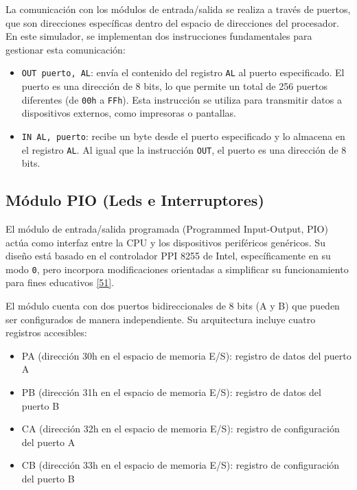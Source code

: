 \documentclass[12pt,oneside]{templates/unerthesis}
\providecommand{\tightlist}{%
  \setlength{\itemsep}{0pt}\setlength{\parskip}{0pt}}
\begin{document}
La comunicación con los módulos de entrada/salida se realiza a través de puertos, que son direcciones específicas dentro del espacio de direcciones del procesador. En este simulador, se implementan dos instrucciones fundamentales para gestionar esta comunicación:

\begin{itemize}
\tightlist
\item
  \texttt{OUT\ puerto,\ AL}: envía el contenido del registro \texttt{AL} al puerto especificado. El puerto es una dirección de 8 bits, lo que permite un total de 256 puertos diferentes (de \texttt{00h} a \texttt{FFh}). Esta instrucción se utiliza para transmitir datos a dispositivos externos, como impresoras o pantallas.
\item
  \texttt{IN\ AL,\ puerto}: recibe un byte desde el puerto especificado y lo almacena en el registro \texttt{AL}. Al igual que la instrucción \texttt{OUT}, el puerto es una dirección de 8 bits.
\end{itemize}

\hypertarget{muxf3dulo-pio-leds-e-interruptores}{%
\subsection{Módulo PIO (Leds e Interruptores)}\label{muxf3dulo-pio-leds-e-interruptores}}

El módulo de entrada/salida programada (Programmed Input-Output, PIO) actúa como interfaz entre la CPU y los dispositivos periféricos genéricos. Su diseño está basado en el controlador PPI 8255 de Intel, específicamente en su modo \texttt{0}, pero incorpora modificaciones orientadas a simplificar su funcionamiento para fines educativos \protect\hyperlink{ref-intel8086manual}{{[}51{]}}.

El módulo cuenta con dos puertos bidireccionales de 8 bits (A y B) que pueden ser configurados de manera independiente. Su arquitectura incluye cuatro registros accesibles:

\begin{itemize}
\tightlist
\item
  PA (dirección 30h en el espacio de memoria E/S): registro de datos del puerto A
\item
  PB (dirección 31h en el espacio de memoria E/S): registro de datos del puerto B
\item
  CA (dirección 32h en el espacio de memoria E/S): registro de configuración del puerto A
\item
  CB (dirección 33h en el espacio de memoria E/S): registro de configuración del puerto B
\end{itemize}
\end{document}
